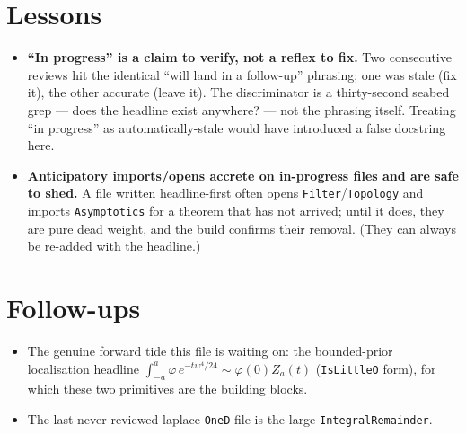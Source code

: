 \documentclass[11pt]{article}
\begin{document}
\section{Lessons}
\begin{itemize}[noitemsep]
  \item \textbf{``In progress'' is a claim to verify, not a reflex to fix.} Two consecutive reviews hit
    the identical ``will land in a follow-up'' phrasing; one was stale (fix it), the other accurate
    (leave it). The discriminator is a thirty-second seabed grep --- does the headline exist anywhere?
    --- not the phrasing itself. Treating ``in progress'' as automatically-stale would have introduced
    a false docstring here.
  \item \textbf{Anticipatory imports/opens accrete on in-progress files and are safe to shed.} A file
    written headline-first often opens \texttt{Filter}/\texttt{Topology} and imports
    \texttt{Asymptotics} for a theorem that has not arrived; until it does, they are pure dead weight,
    and the build confirms their removal. (They can always be re-added with the headline.)
\end{itemize}

\section{Follow-ups}
\begin{itemize}[noitemsep]
  \item The genuine forward tide this file is waiting on: the bounded-prior localisation headline
    $\int_{-a}^a\varphi\,e^{-tw^4/24}\sim\varphi(0)Z_a(t)$ (\texttt{IsLittleO} form), for which these
    two primitives are the building blocks.
  \item The last never-reviewed laplace \texttt{OneD} file is the large \texttt{IntegralRemainder}.
\end{itemize}
\end{document}
